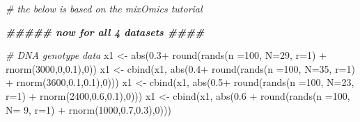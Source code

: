 \documentclass[
]{article}
\newenvironment{Shaded}{\begin{snugshade}}{\end{snugshade}}
\newcommand{\AttributeTok}[1]{\textcolor[rgb]{0.77,0.63,0.00}{#1}}
\newcommand{\CommentTok}[1]{\textcolor[rgb]{0.56,0.35,0.01}{\textit{#1}}}
\newcommand{\DecValTok}[1]{\textcolor[rgb]{0.00,0.00,0.81}{#1}}
\newcommand{\DocumentationTok}[1]{\textcolor[rgb]{0.56,0.35,0.01}{\textbf{\textit{#1}}}}
\newcommand{\FloatTok}[1]{\textcolor[rgb]{0.00,0.00,0.81}{#1}}
\newcommand{\FunctionTok}[1]{\textcolor[rgb]{0.00,0.00,0.00}{#1}}
\newcommand{\NormalTok}[1]{#1}
\newcommand{\OtherTok}[1]{\textcolor[rgb]{0.56,0.35,0.01}{#1}}
\newcommand{\SpecialCharTok}[1]{\textcolor[rgb]{0.00,0.00,0.00}{#1}}
\begin{document}
\begin{Shaded}
\begin{Highlighting}[]
\CommentTok{\# the below is based on the mixOmics tutorial}

\DocumentationTok{\#\#\#\#\# now for all 4 datasets \#\#\#\#}

\CommentTok{\# DNA genotype data}
\NormalTok{x1 }\OtherTok{\textless{}{-}}           \FunctionTok{abs}\NormalTok{(}\FloatTok{0.3}\SpecialCharTok{+} \FunctionTok{round}\NormalTok{(}\FunctionTok{rands}\NormalTok{(}\AttributeTok{n =}\DecValTok{100}\NormalTok{, }\AttributeTok{N=}\DecValTok{29}\NormalTok{, }\AttributeTok{r=}\DecValTok{1}\NormalTok{) }\SpecialCharTok{+}
                                 \FunctionTok{rnorm}\NormalTok{(}\DecValTok{3000}\NormalTok{,}\DecValTok{0}\NormalTok{,}\FloatTok{0.1}\NormalTok{),}\DecValTok{0}\NormalTok{))}
\NormalTok{x1 }\OtherTok{\textless{}{-}} \FunctionTok{cbind}\NormalTok{(x1, }\FunctionTok{abs}\NormalTok{(}\FloatTok{0.4}\SpecialCharTok{+} \FunctionTok{round}\NormalTok{(}\FunctionTok{rands}\NormalTok{(}\AttributeTok{n =}\DecValTok{100}\NormalTok{, }\AttributeTok{N=}\DecValTok{35}\NormalTok{, }\AttributeTok{r=}\DecValTok{1}\NormalTok{) }\SpecialCharTok{+}
                                 \FunctionTok{rnorm}\NormalTok{(}\DecValTok{3600}\NormalTok{,}\FloatTok{0.1}\NormalTok{,}\FloatTok{0.1}\NormalTok{),}\DecValTok{0}\NormalTok{)))}
\NormalTok{x1 }\OtherTok{\textless{}{-}} \FunctionTok{cbind}\NormalTok{(x1, }\FunctionTok{abs}\NormalTok{(}\FloatTok{0.5}\SpecialCharTok{+} \FunctionTok{round}\NormalTok{(}\FunctionTok{rands}\NormalTok{(}\AttributeTok{n =}\DecValTok{100}\NormalTok{, }\AttributeTok{N=}\DecValTok{23}\NormalTok{, }\AttributeTok{r=}\DecValTok{1}\NormalTok{) }\SpecialCharTok{+}
                                 \FunctionTok{rnorm}\NormalTok{(}\DecValTok{2400}\NormalTok{,}\FloatTok{0.6}\NormalTok{,}\FloatTok{0.1}\NormalTok{),}\DecValTok{0}\NormalTok{)))}
\NormalTok{x1 }\OtherTok{\textless{}{-}} \FunctionTok{cbind}\NormalTok{(x1, }\FunctionTok{abs}\NormalTok{(}\FloatTok{0.6} \SpecialCharTok{+} \FunctionTok{round}\NormalTok{(}\FunctionTok{rands}\NormalTok{(}\AttributeTok{n =}\DecValTok{100}\NormalTok{, }\AttributeTok{N=} \DecValTok{9}\NormalTok{, }\AttributeTok{r=}\DecValTok{1}\NormalTok{) }\SpecialCharTok{+}
                                  \FunctionTok{rnorm}\NormalTok{(}\DecValTok{1000}\NormalTok{,}\FloatTok{0.7}\NormalTok{,}\FloatTok{0.3}\NormalTok{),}\DecValTok{0}\NormalTok{)))}


\end{Highlighting}
\end{Shaded}
\end{document}
